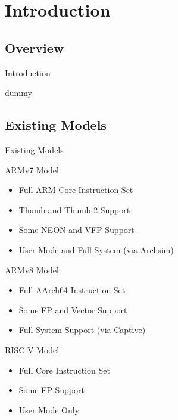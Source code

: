 \section{Introduction}
\subsection{Overview}
\begin{frame}{Introduction}

\end{frame}

\begin{frame}
	\tableofcontents
\end{frame}	



\begin{frame}{dummy}\end{frame}

\subsection{Existing Models}

\begin{frame}{Existing Models}

\end{frame}

\begin{frame}{ARMv7 Model}

\begin{itemize}
	\item Full ARM Core Instruction Set
	\item Thumb and Thumb-2 Support
	\item Some NEON and VFP Support
	\item User Mode and Full System (via Archsim)
\end{itemize}

\end{frame}

\begin{frame}{ARMv8 Model}

\begin{itemize}
	\item Full AArch64 Instruction Set
	\item Some FP and Vector Support
	\item Full-System Support (via Captive)
\end{itemize}

\end{frame}

\begin{frame}{RISC-V Model}

\begin{itemize}
	\item Full Core Instruction Set
	\item Some FP Support
	\item User Mode Only
\end{itemize}

\end{frame}
